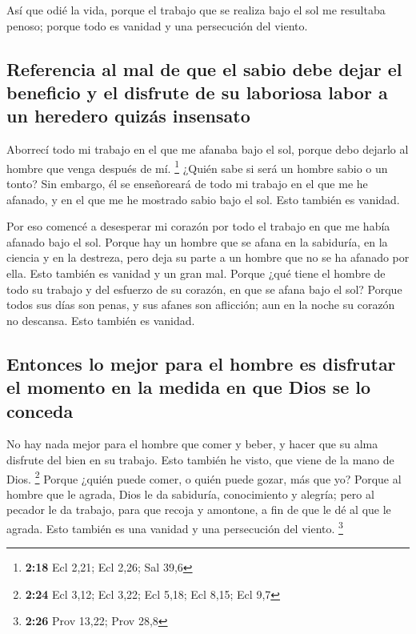  Así que odié la vida, porque el trabajo que se realiza
bajo el sol me resultaba penoso; porque todo es vanidad y una
persecución del viento.

\hypertarget{referencia-al-mal-de-que-el-sabio-debe-dejar-el-beneficio-y-el-disfrute-de-su-laboriosa-labor-a-un-heredero-quizuxe1s-insensato}{%
\subsection{Referencia al mal de que el sabio debe dejar el beneficio y
el disfrute de su laboriosa labor a un heredero quizás
insensato}\label{referencia-al-mal-de-que-el-sabio-debe-dejar-el-beneficio-y-el-disfrute-de-su-laboriosa-labor-a-un-heredero-quizuxe1s-insensato}}

 Aborrecí todo mi trabajo en el que me afanaba bajo el
sol, porque debo dejarlo al hombre que venga después de mí. \footnote{\textbf{2:18}
  Ecl 2,21; Ecl 2,26; Sal 39,6}  ¿Quién sabe si será un
hombre sabio o un tonto? Sin embargo, él se enseñoreará de todo mi
trabajo en el que me he afanado, y en el que me he mostrado sabio bajo
el sol. Esto también es vanidad.

 Por eso comencé a desesperar mi corazón por todo el
trabajo en que me había afanado bajo el sol.  Porque hay
un hombre que se afana en la sabiduría, en la ciencia y en la destreza,
pero deja su parte a un hombre que no se ha afanado por ella. Esto
también es vanidad y un gran mal.  Porque ¿qué tiene el
hombre de todo su trabajo y del esfuerzo de su corazón, en que se afana
bajo el sol?  Porque todos sus días son penas, y sus
afanes son aflicción; aun en la noche su corazón no descansa. Esto
también es vanidad.

\hypertarget{entonces-lo-mejor-para-el-hombre-es-disfrutar-el-momento-en-la-medida-en-que-dios-se-lo-conceda}{%
\subsection{Entonces lo mejor para el hombre es disfrutar el momento en
la medida en que Dios se lo
conceda}\label{entonces-lo-mejor-para-el-hombre-es-disfrutar-el-momento-en-la-medida-en-que-dios-se-lo-conceda}}

 No hay nada mejor para el hombre que comer y beber, y
hacer que su alma disfrute del bien en su trabajo. Esto también he
visto, que viene de la mano de Dios. \footnote{\textbf{2:24} Ecl 3,12;
  Ecl 3,22; Ecl 5,18; Ecl 8,15; Ecl 9,7}  Porque ¿quién
puede comer, o quién puede gozar, más que yo?  Porque al
hombre que le agrada, Dios le da sabiduría, conocimiento y alegría; pero
al pecador le da trabajo, para que recoja y amontone, a fin de que le dé
al que le agrada. Esto también es una vanidad y una persecución del
viento. \footnote{\textbf{2:26} Prov 13,22; Prov 28,8}

